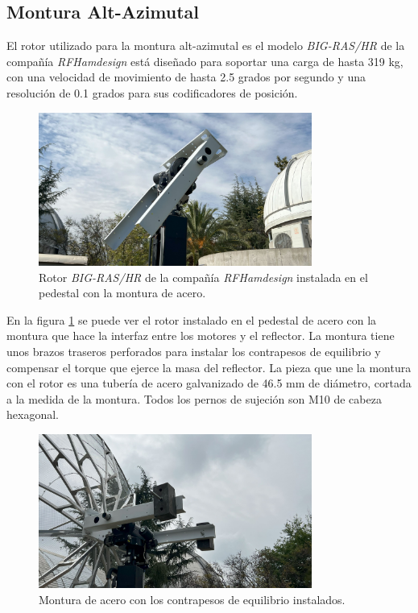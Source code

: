 \subsection{Montura Alt-Azimutal}

El rotor utilizado para la montura alt-azimutal es el modelo \textit{BIG-RAS/HR} de la compañía \textit{RFHamdesign} está diseñado para soportar una carga de hasta 319 kg, con una velocidad de movimiento de hasta 2.5 grados por segundo y una resolución de 0.1 grados para sus codificadores de posición.\\

\begin{figure}
    \centering
    \includegraphics[width=0.8\textwidth]{img/soporte_montura}
    \caption{Rotor \textit{BIG-RAS/HR} de la compañía \textit{RFHamdesign} instalada en el pedestal con la montura de acero.}
    \label{fig:ensamble10}
\end{figure}

En la figura \ref{fig:ensamble10} se puede ver el rotor instalado en el pedestal de acero con la montura que hace la interfaz entre los motores y el reflector. La montura tiene unos brazos traseros perforados para instalar los contrapesos de equilibrio y compensar el torque que ejerce la masa del reflector. La pieza que une la montura con el rotor es una tubería de acero galvanizado de 46.5 mm de diámetro, cortada a la medida de la montura. Todos los pernos de sujeción son M10 de cabeza hexagonal.\\

\begin{figure}
    \centering
    \includegraphics[width=0.8\textwidth]{img/contrapesos}
    \caption{Montura de acero con los contrapesos de equilibrio instalados.}
    \label{fig:ensamble11}
\end{figure}

